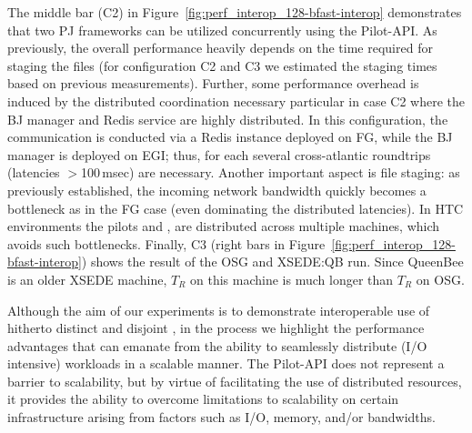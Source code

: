 \documentclass[conference]{IEEEtran}
\begin{document}


The middle bar (C2) in Figure~\ref{fig:perf_interop_128-bfast-interop}
demonstrates that two PJ frameworks can be utilized concurrently using
the Pilot-API. As previously, the overall performance heavily depends
on the time required for staging the files (for configuration C2 and
C3 we estimated the staging times based on previous
measurements). Further, some performance overhead is induced by the
distributed coordination necessary particular in case C2 where the BJ
manager and Redis service are highly distributed. In this
configuration, the communication is conducted via a Redis instance
deployed on FG, while the BJ manager is deployed on EGI; thus, for
each \cu several cross-atlantic roundtrips (latencies $>$100\,msec)
are necessary. Another important aspect is file staging: as previously
established, the incoming network bandwidth quickly becomes a
bottleneck as in the FG case (even dominating the distributed
latencies). In HTC environments the pilots and 
\cus, are distributed across multiple machines, which avoids such
bottlenecks.  Finally, C3 (right bars in
Figure~\ref{fig:perf_interop_128-bfast-interop}) shows the result of
the OSG and XSEDE:QB run. Since QueenBee is an older XSEDE machine,
$T_R$ on this machine is much longer than $T_R$ on OSG.


Although the aim of our experiments is to demonstrate interoperable
use of hitherto distinct and disjoint \pilotjobs, in the process we
highlight the performance advantages that can emanate from the ability
to seamlessly distribute (I/O intensive) workloads in a scalable
manner. The Pilot-API does not represent a barrier to
scalability, but by virtue of facilitating the use of distributed
resources, it provides the ability to overcome limitations to
scalability on certain infrastructure arising from factors such as
I/O, memory, and/or bandwidths. 

\upp
\end{document}
